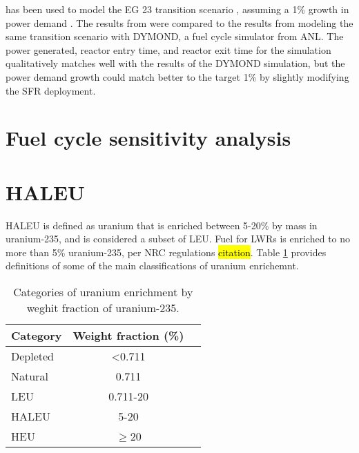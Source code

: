 \Cyclus has been used to model the EG 23 transition scenario 
\cite{wigeland_nuclear_2014}, assuming a 1\% growth in power demand 
\cite{djokic_application_2015}. The results from \Cyclus were compared 
to the results from modeling the same transition scenario with DYMOND, 
a fuel cycle simulator from \gls{ANL}. The power generated, reactor entry 
time, and reactor exit time for the \Cyclus simulation qualitatively 
matches well with the results of the DYMOND simulation, but the power 
demand growth could match better to the target 1\% by slightly modifying 
the \gls{SFR} deployment. 

\section{Fuel cycle sensitivity analysis}

\section{HALEU}
\gls{HALEU} is defined as uranium that is enriched between 5-20\% by mass in 
uranium-235, and is considered a subset of \gls{LEU}. Fuel for \glspl{LWR} 
is enriched to no more than 5\% uranium-235, per \gls{NRC} regulations 
\hl{citation}. Table \ref{tab:enrichemnt} provides definitions of some of the 
main classifications of uranium enrichemnt. 

\begin{table}
    \centering
    \caption{Categories of uranium enrichment by weghit fraction of 
    uranium-235.}
    \label{tab:enrichemnt}
    \begin{tabular}{l c c}
        \hline
        Category & Weight fraction (\%)\\\hline
        Depleted & <0.711 \\
        Natural & 0.711 \\
        \gls{LEU} & 0.711-20 \\
        \gls{HALEU} & 5-20 \\
        \gls{HEU} & $\ge$20 \\
        \hline
    \end{tabular}
\end{table}

